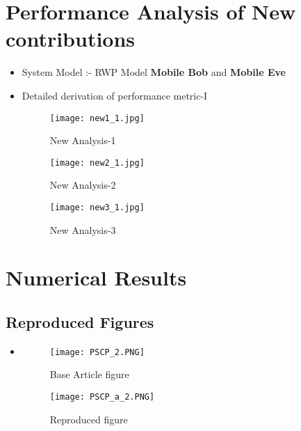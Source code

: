 \documentclass{article}
\begin{document}
\newpage
\section {Performance Analysis of New contributions}
\begin{itemize}
\item System Model :- RWP Model \textbf{Mobile Bob} and \textbf{Mobile Eve}
\item Detailed derivation of performance metric-I \\
    \begin{figure}[htp]
        \centering
        \texttt{[image: new1\_1.jpg]}
        \caption{New Analysis-1}
        \label{fig:my_label}
    \end{figure}
    \begin{figure}[htp]
        \centering
        \texttt{[image: new2\_1.jpg]}
        \caption{New Analysis-2}
        \label{fig:my_label}
    \end{figure}
    
     \begin{figure}[htp]
        \centering
        \texttt{[image: new3\_1.jpg]}
        \caption{New Analysis-3}
        \label{fig:my_label}
    \end{figure}
\end{itemize}
\newpage
\section{Numerical Results}

\subsection{Reproduced Figures}
\begin{itemize}
\item 
\begin{figure}[htp]
    \centering
    \begin{minipage}{0.45\textwidth}
        \centering
        \texttt{[image: PSCP\_2.PNG]} %
        \caption{Base Article figure}
    \end{minipage}\hfill
    \begin{minipage}{0.45\textwidth}
        \centering
        \texttt{[image: PSCP\_a\_2.PNG]} %
        \caption{Reproduced figure}
    \end{minipage}
\end{figure}
\end{itemize}\\
\end{document}

